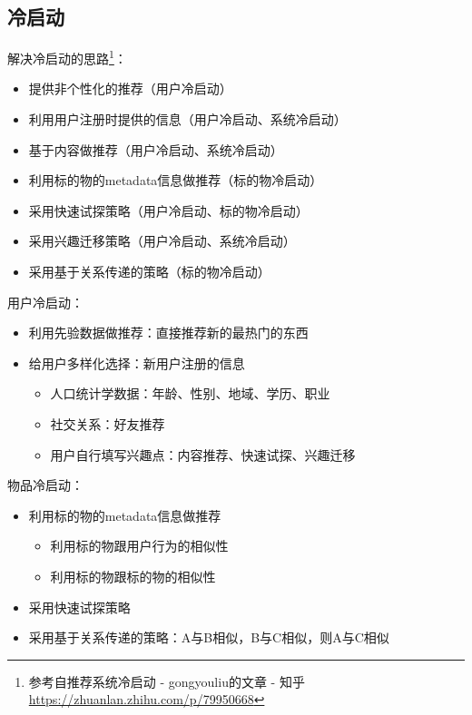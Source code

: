 \subsection{冷启动}
解决冷启动的思路\footnote{参考自推荐系统冷启动 - gongyouliu的文章 - 知乎\url{https://zhuanlan.zhihu.com/p/79950668}}：
\begin{itemize}
	\item 提供非个性化的推荐（用户冷启动）
	\item 利用用户注册时提供的信息（用户冷启动、系统冷启动）
	\item 基于内容做推荐（用户冷启动、系统冷启动）
	\item 利用标的物的metadata信息做推荐（标的物冷启动）
	\item 采用快速试探策略（用户冷启动、标的物冷启动）
	\item 采用兴趣迁移策略（用户冷启动、系统冷启动）
	\item 采用基于关系传递的策略（标的物冷启动）
\end{itemize}

用户冷启动：
\begin{itemize}
	\item 利用先验数据做推荐：直接推荐新的最热门的东西
	\item 给用户多样化选择：新用户注册的信息
	\begin{itemize}
		\item 人口统计学数据：年龄、性别、地域、学历、职业
		\item 社交关系：好友推荐
		\item 用户自行填写兴趣点：内容推荐、快速试探、兴趣迁移
	\end{itemize}
\end{itemize}

物品冷启动：
\begin{itemize}
	\item 利用标的物的metadata信息做推荐
	\begin{itemize}
		\item 利用标的物跟用户行为的相似性
		\item 利用标的物跟标的物的相似性
	\end{itemize}
	\item 采用快速试探策略
	\item 采用基于关系传递的策略：A与B相似，B与C相似，则A与C相似
\end{itemize}